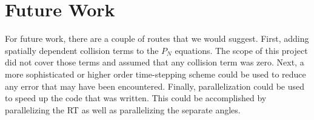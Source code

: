 
\section*{Future Work}

For future work, there are a couple of routes that we would suggest.
First, adding spatially dependent collision terms to the $P_N$ equations.
The scope of this project did not cover those terms and assumed that any collision term was zero.
Next, a more sophisticated or higher order time-stepping scheme could be used to reduce any error that may have been encountered.
Finally, parallelization could be used to speed up the code that was written.
This could be accomplished by parallelizing the RT as well as parallelizing the separate angles.